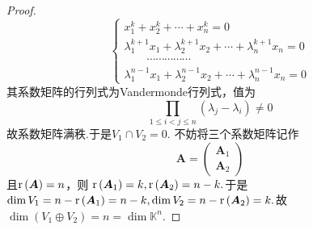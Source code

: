 {\begin{proof}
\[\begin{cases*}
                x_1^{k}+x_2^k+\cdots+x^k_n=0                                        \\
                \lambda_1^{k+1}x_1+\lambda_2^{k+1}x_2+\cdots+\lambda_n^{k+1}x_n=0   \\
                \qquad\cdots\cdots\cdots\cdots\cdots                                \\
                \lambda_{1}^{n-1}x_1+\lambda_2^{n-1}x_2+\cdots+\lambda_n^{n-1}x_n=0
            \end{cases*}
        \]
        其系数矩阵的行列式为Vandermonde行列式，值为
        \[
            \prod_{1\leqslant i<j\leqslant n}
            \left(\lambda_j-\lambda_i\right)
            \neq 0
        \]
        故系数矩阵满秩.于是$V_1\cap V_2=0.$
        不妨将三个系数矩阵记作
        \[
            \bm{A}=\begin{pmatrix}
                \bm{A}_1 \\\bm{A}_2
            \end{pmatrix}
        \]
        且$\mathrm{r} \left(\bm{A}\right)=n$，则
        $\mathrm{r} \left(\bm{A}_1\right)=k,\mathrm{r} \left(\bm{A}_2\right)=n-k.$于是$\dim V_1=n-\mathrm{r} \left(\bm{A}_1\right)=n-k,
            \dim V_2=n-\mathrm{r} \left(\bm{A}_2\right)=k.$故$\dim\left(V_1\oplus V_2\right)=n=\dim \mathbb{K}^n.$
    \end{proof}
}
